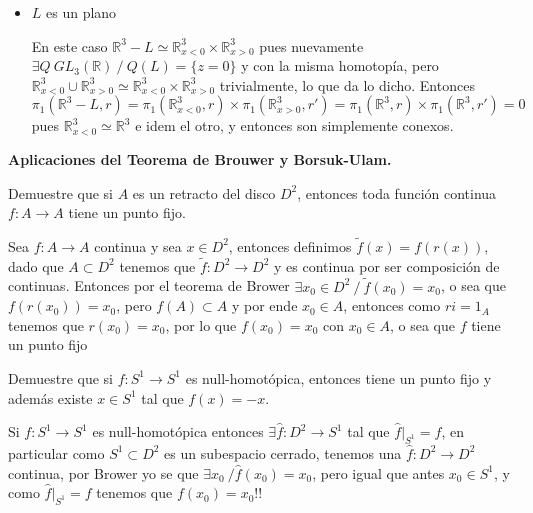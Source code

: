 \documentclass[11pt]{article}
\newcommand{\R}{{\mathbb{R}}}
\newenvironment{proof}[1][Demostraci\'on]{\begin{trivlist}
\item[\hskip \labelsep {\bfseries #1}]}{\end{trivlist}}
\newcommand{\qed}{\nobreak \ifvmode \relax \else
      \ifdim\lastskip<1.5em \hskip-\lastskip
      \hskip1.5em plus0em minus0.5em \fi \nobreak
      \vrule height0.75em width0.5em depth0.25em\fi}
\begin{document}
\begin{enumerate}
\begin{proof}
\begin{enumerate}
\begin{itemize}
\item{$L$ es un plano}

En este caso $\R^3-L \simeq \R^3_{x<0} \times \R^3_{x>0}$ pues nuevamente $\exists Q \ GL_3(\R) \ / \ Q(L)= \{z=0\}$ y con la misma homotop\'ia, pero $\R^3_{x<0} \cup \R^3_{x>0} \simeq \R^3_{x<0} \times \R^3_{x>0}$ trivialmente, lo que da lo dicho. Entonces $\pi_1(\R^3-L,r) = \pi_1(\R^3_{x<0},r) \times \pi_1(\R^3_{x>0},r') = \pi_1(\R^3,r) \times \pi_1(\R^3,r')=0$ pues $\R^3_{x<0} \simeq \R^3$ e idem el otro, y entonces son simplemente conexos. 
\end{itemize}

\end{enumerate}

\end{proof}

\bigskip

\sffamily

\noindent 
\textbf{Aplicaciones del Teorema de Brouwer y Borsuk-Ulam.}


\item {Demuestre que si $A$ es un retracto del disco $D^2$, entonces toda funci\'on continua $f:A\to A$ tiene un punto fijo.}

\begin{proof}

Sea $f:A \rightarrow A$ continua y sea $x \in D^2$, entonces definimos $\widetilde{f}(x)=f(r(x))$, dado que $A \subset D^2$ tenemos que $\widetilde{f}:D^2 \rightarrow D^2$ y es continua por ser composici\'on de continuas. Entonces por el teorema de Brower $\exists x_0 \in D^2 \ / \ \widetilde{f}(x_0)=x_0$, o sea que $f(r(x_0))=x_0$, pero $f(A)\subset A$ y por ende $x_0 \in A$, entonces como $ri=1_A$ tenemos que $r(x_0)=x_0$, por lo que $f(x_0)=x_0$ con $x_0 \in A$, o sea que $f$ tiene un punto fijo \qed

\end{proof}

\item {Demuestre que si $f:S^1\to S^1$ es null-homot\'opica, entonces tiene un punto fijo y adem\'as existe $x\in S^1$ tal que $f(x)=-x$.}

\begin{proof}

Si $f:S^1 \rightarrow S^1$ es null-homot\'opica entonces $\exists \widehat{f}:D^2 \rightarrow S^1$ tal que $\widehat{f}|_{S^1}=f$, en particular como $S^1 \subset D^2$ es un subespacio cerrado, tenemos una $\widehat{f}:D^2 \rightarrow D^2$ continua, por Brower yo se que $\exists x_0 \ / \widehat{f}(x_0)=x_0$, pero igual que antes $x_0 \in S^1$, y como $\widehat{f}|_{S^1}=f$ tenemos que $f(x_0)= x_0$!!


\end{proof}
\end{enumerate}
\end{document}
